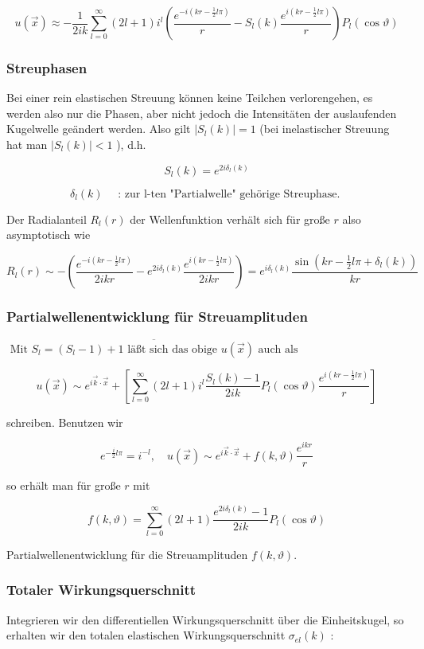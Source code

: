 \documentclass[10pt, letterpaper]{article}
\begin{document}
$$
u(\vec{x}) \approx-\frac{1}{2 i k} \sum_{l=0}^{\infty}(2 l+1) i^{l}\left(\frac{e^{-i\left(k r-\frac{1}{2} l \pi\right)}}{r}-S_{l}(k) \frac{e^{i\left(k r-\frac{1}{2} l \pi\right)}}{r}\right) P_{l}(\cos \vartheta)
$$

\subsubsection*{Streuphasen}
Bei einer rein elastischen Streuung können keine Teilchen verlorengehen, es werden also nur die Phasen, aber nicht jedoch die Intensitäten der auslaufenden Kugelwelle geändert werden. Also gilt $\left|S_{l}(k)\right|=1$ (bei inelastischer Streuung hat man $\left|S_{l}(k)\right|<1$ ), d.h.

$$
S_{l}(k)=e^{2 i \delta_{l}(k)}
$$

$$
\delta_{l}(k) \quad \text { : zur l-ten "Partialwelle" gehörige Streuphase. }
$$

Der Radialanteil $R_{l}(r)$ der Wellenfunktion verhält sich für große $r$ also asymptotisch wie

$$
R_{l}(r) \sim-\left(\frac{e^{-i\left(k r-\frac{1}{2} l \pi\right)}}{2 i k r}-e^{2 i \delta_{l}(k)} \frac{e^{i\left(k r-\frac{1}{2} l \pi\right)}}{2 i k r}\right)=e^{i \delta_{l}(k)} \frac{\sin \left(k r-\frac{1}{2} l \pi+\delta_{l}(k)\right)}{k r}
$$

\subsubsection*{Partialwellenentwicklung für Streuamplituden}
$\overline{\text { Mit } S_{l}=\left(S_{l}-1\right)+1 \text { läßt sich das obige } u(\vec{x}) \text { auch als }}$

$$
u(\vec{x}) \sim e^{i \vec{k} \cdot \vec{x}}+\left[\sum_{l=0}^{\infty}(2 l+1) i^{l} \frac{S_{l}(k)-1}{2 i k} P_{l}(\cos \vartheta) \frac{e^{i\left(k r-\frac{1}{2} l \pi\right)}}{r}\right]
$$

schreiben. Benutzen wir

$$
e^{-\frac{i}{2} l \pi}=i^{-l}, \quad u(\vec{x}) \sim e^{i \vec{k} \cdot \vec{x}}+f(k, \vartheta) \frac{e^{i k r}}{r}
$$

so erhält man für große $r$ mit

$$
f(k, \vartheta)=\sum_{l=0}^{\infty}(2 l+1) \frac{e^{2 i \delta_{l}(k)}-1}{2 i k} P_{l}(\cos \vartheta)
$$

Partialwellenentwicklung für die Streuamplituden $f(k, \vartheta)$.

\subsubsection*{Totaler Wirkungsquerschnitt}
Integrieren wir den differentiellen Wirkungsquerschnitt über die Einheitskugel, so erhalten wir den totalen elastischen Wirkungsquerschnitt $\sigma_{e l}(k)$ :
\end{document}
